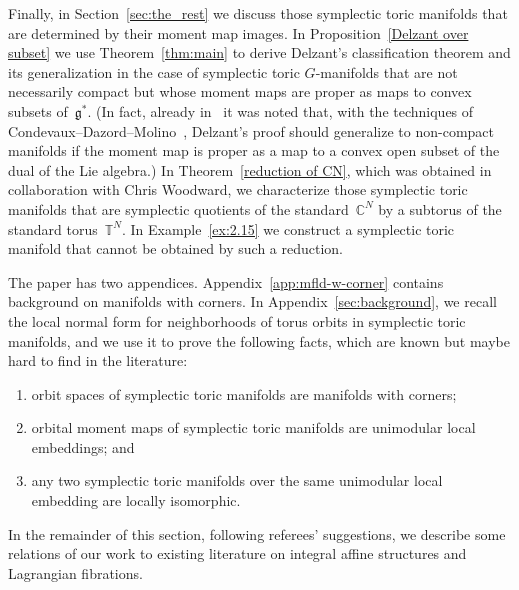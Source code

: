 \documentclass[10pt,a4paper]{amsart}
\numberwithin{equation}{section}
\begin{document}
Finally, in Section~\ref{sec:the_rest} we discuss those symplectic
toric manifolds that are determined by their moment map images.
In Proposition~\ref{Delzant over subset} we use Theorem~\ref{thm:main}
to derive Delzant's classif\/ication theorem and its generalization in the
case of symplectic toric $G$-manifolds that are not necessarily
compact but whose moment maps are proper as maps to convex subsets of~${\mathfrak g}^*$.
(In fact, already in~\cite{ka:appendix} it was noted that,
with the techniques of Condevaux--Dazord--Molino~\cite{CDM},
Delzant's proof should generalize to non-compact manifolds if the moment map
is proper as a map to a convex open subset of the dual of the Lie algebra.)
In Theorem~\ref{reduction of CN}, which was obtained in collaboration
with Chris Woodward,
we characterize those symplectic toric manifolds that
are symplectic quotients of the standard~${\mathbb C}^N$ by a subtorus of the
standard torus~${\mathbb T}^N$.
In Example~\ref{ex:2.15} we construct
a symplectic toric manifold that cannot be obtained by such a reduction.

The paper has two appendices.
Appendix~\ref{app:mfld-w-corner} contains background on manifolds with corners.
In Appendix~\ref{sec:background}, we recall the local normal form for
neighborhoods of torus orbits in symplectic toric manifolds,
and we use it to prove the following facts,
which are known but maybe hard to f\/ind in the literature:
\begin{enumerate}[1)]\itemsep=0pt
\item
orbit spaces of symplectic toric manifolds are
manifolds with corners;
\item
orbital moment maps of symplectic toric manifolds are
unimodular local embeddings; and
\item
any two symplectic toric manifolds over the same unimodular local embedding
are locally isomorphic.
\end{enumerate}


In the remainder of this section, following referees' suggestions,
we describe some relations of our work to existing literature
on integral af\/f\/ine structures and Lagrangian f\/ibrations.
\end{document}
